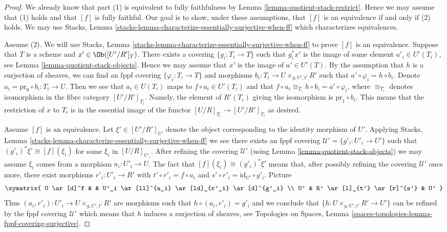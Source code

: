 \begin{proof}
We already know that part (1) is equivalent to
fully faithfulness by
Lemma \ref{lemma-quotient-stack-restrict}.
Hence we may assume that (1) holds and that $[f]$ is fully faithful.
Our goal is to show, under these assumptions, that $[f]$ is an equivalence
if and only if (2) holds. We may use
Stacks, Lemma \ref{stacks-lemma-characterize-essentially-surjective-when-ff}
which characterizes equivalences.

\medskip\noindent
Assume (2). We will use
Stacks, Lemma \ref{stacks-lemma-characterize-essentially-surjective-when-ff}
to prove $[f]$ is an equivalence.
Suppose that $T$ is a scheme and $x' \in \Ob([U'/R']_T)$.
There exists a covering $\{g_i : T_i \to T\}$ such that $g_i^*x'$
is the image of some element $a'_i \in U'(T_i)$, see
Lemma \ref{lemma-quotient-stack-objects}.
Hence we may assume that $x'$ is the image of $a' \in U'(T)$.
By the assumption that $h$ is a surjection of sheaves, we
can find an fppf covering $\{\varphi_i : T_i \to T\}$ and morphisms
$b_i : T_i \to U \times_{g, U', t'} R'$ such that
$a' \circ \varphi_i = h \circ b_i$. Denote
$a_i = \text{pr}_0 \circ b_i : T_i \to U$. Then we see that
$a_i \in U(T_i)$ maps to $f \circ a_i \in U'(T_i)$ and
that $f \circ a_i \cong_{T_i} h \circ b_i = a' \circ \varphi_i$,
where $\cong_{T_i}$ denotes isomorphism in the fibre category
$[U'/R']_{T_i}$. Namely, the element of $R'(T_i)$ giving the isomorphism
is $\text{pr}_1 \circ b_i$. This means that the restriction
of $x$ to $T_i$ is in the essential image of the functor
$[U/R]_{T_i} \to [U'/R']_{T_i}$ as desired.

\medskip\noindent
Assume $[f]$ is an equivalence. Let $\xi' \in [U'/R']_{U'}$ denote the
object corresponding to the identity morphism of $U'$. Applying
Stacks, Lemma \ref{stacks-lemma-characterize-essentially-surjective-when-ff}
we see there exists an fppf covering $\mathcal{U}' = \{g'_i : U'_i \to U'\}$
such that $(g'_i)^*\xi' \cong [f](\xi_i)$ for some $\xi_i$ in $[U/R]_{U'_i}$.
After refining the covering $\mathcal{U}'$ (using
Lemma \ref{lemma-quotient-stack-objects})
we may assume $\xi_i$ comes from a morphism $a_i : U'_i \to U$.
The fact that $[f](\xi_i) \cong (g'_i)^*\xi'$ means that, after possibly
refining the covering $\mathcal{U}'$ once more, there exist morphisms
$r'_i : U'_i \to R'$ with $t' \circ r'_i = f \circ a_i$ and
$s' \circ r'_i = \text{id}_{U'} \circ g'_i$. Picture
$$
\xymatrix{
U \ar[d]^f & & U'_i \ar[ll]^{a_i} \ar[ld]_{r'_i} \ar[d]^{g'_i} \\
U' & R' \ar[l]_{t'} \ar[r]^{s'} & U'
}
$$
Thus $(a_i, r'_i) : U'_i \to U \times_{g, U', t'} R'$ are morphisms
such that $h \circ (a_i, r'_i) = g'_i$ and we conclude that
$\{h : U \times_{g, U', t'} R' \to U'\}$ can be refined by the
fppf covering $\mathcal{U}'$ which means that $h$ induces a surjection
of sheaves, see
Topologies on Spaces, Lemma
\ref{spaces-topologies-lemma-fppf-covering-surjective}.


\end{proof}
